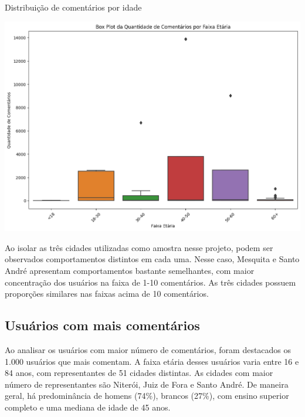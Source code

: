 \begin{quadro}[!htb]
	\caption{Distribuição de comentários por idade}
	\label{fig:colab_comments_by_age}
	\centering
	\includegraphics[scale=0.5]{images/colab_comments_by_age.png}
\end{quadro}

Ao isolar as três cidades utilizadas como amostra nesse projeto, podem ser observados comportamentos distintos em cada uma. Nesse caso, Mesquita e Santo André apresentam comportamentos bastante semelhantes, com maior concentração dos usuários na faixa de 1-10 comentários. As três cidades possuem proporções similares nas faixas acima de 10 comentários.

\subsection*{Usuários com mais comentários}

Ao analisar os usuários com maior número de comentários, foram destacados os 1.000 usuários que mais comentam. A faixa etária desses usuários varia entre 16 e 84 anos, com representantes de 51 cidades distintas. As cidades com maior número de representantes são Niterói, Juiz de Fora e Santo André. De maneira geral, há predominância de homens (74\%), brancos (27\%), com ensino superior completo e uma mediana de idade de 45 anos.

